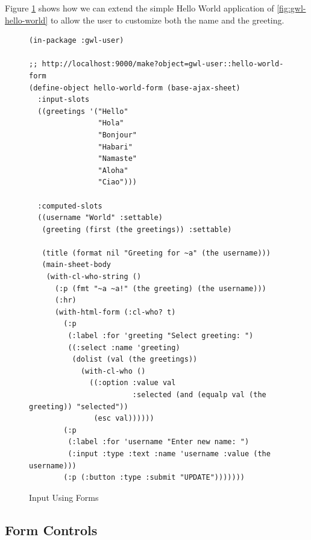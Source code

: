 \documentclass [11pt]{book}
\begin{document}
Figure 
\ref{fig:gwl-hello-world-form} shows how we can extend the simple
Hello World application of 
\ref{fig:gwl-hello-world} to allow the user to
customize both the name and the greeting.
\begin{figure}
\begin{lrbox}{\boxedverb}
\begin{minipage}{\linewidth}
{\small

\begin{verbatim}(in-package :gwl-user)

;; http://localhost:9000/make?object=gwl-user::hello-world-form
(define-object hello-world-form (base-ajax-sheet)
  :input-slots
  ((greetings '("Hello"
                "Hola"
                "Bonjour"
                "Habari"
                "Namaste"
                "Aloha"
                "Ciao")))
  
  :computed-slots
  ((username "World" :settable)
   (greeting (first (the greetings)) :settable)
   
   (title (format nil "Greeting for ~a" (the username)))
   (main-sheet-body
    (with-cl-who-string ()
      (:p (fmt "~a ~a!" (the greeting) (the username)))
      (:hr)
      (with-html-form (:cl-who? t)
        (:p
         (:label :for 'greeting "Select greeting: ")
         ((:select :name 'greeting)
          (dolist (val (the greetings))
            (with-cl-who ()
              ((:option :value val
                        :selected (and (equalp val (the greeting)) "selected"))
               (esc val))))))
        (:p
         (:label :for 'username "Enter new name: ")
         (:input :type :text :name 'username :value (the username)))
        (:p (:button :type :submit "UPDATE")))))))

\end{verbatim}}
\end{minipage}
\end{lrbox}
\fbox{\usebox{\boxedverb}}

\caption{Input Using Forms}

\label{fig:gwl-hello-world-form}

\end{figure}




\subsection{Form Controls}

\label{subsec:formcontrols}
\end{document}
